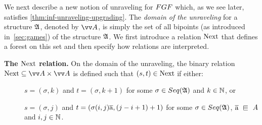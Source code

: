 We next describe a new notion of unraveling for $\FGF$ which, as we see later, satisfies \cref{thm:inf-unraveling-upgrading}.
The \emph{domain of the unraveling} for a structure ${\mathfrak{A}}$, denoted by $\unraveldom{A}$, is simply the set of all bipoints (as introduced in~\ref{sec:games}) of the structure ${\mathfrak{A}}$.
We first introduce a relation $\mathrm{Next}$ that defines a forest on this set and then specify how relations are interpreted.

\noindent \textbf{The $\mathrm{Next}$ relation.}
On the domain of the unraveling, the binary relation $\relNext \subseteq \unraveldom{A} \times \unraveldom{A}$ is defined such that $(s, t) \in \mathrm{Next}$ if either:
\begin{description}
  \item[] $s = (\sigma, k)$ and $t = (\sigma, k + 1)$ for some $\sigma \in \Seq{A}$ and $k \in {\mathbb{N}}$, or
  \item[] $s = (\sigma, j)$ and $t = (\sigma(i,j)\overline{\mathrm{a}}, (j-i+1) + 1)$ for some $\sigma \in \Seq{A}$, $\elemtuplea \sqin A$ and $i,j \in {\mathbb{N}}$.
\end{description}
